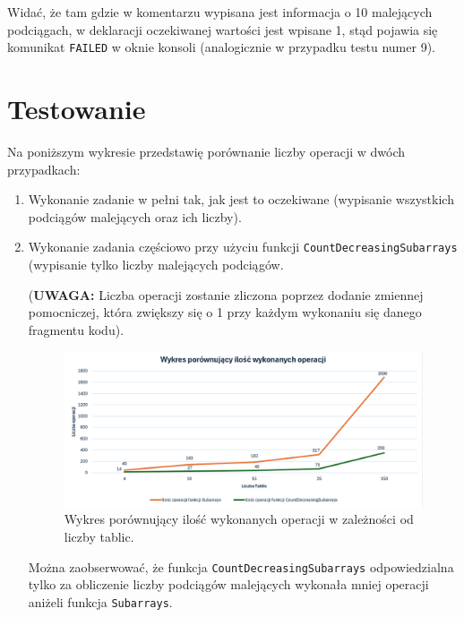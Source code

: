\documentclass[a4paper,12pt]{article}
\begin{document}
\rule{0cm}{0.1cm} %

Widać, że tam gdzie w komentarzu wypisana jest informacja o 10 malejących podciągach, w deklaracji oczekiwanej wartości jest wpisane 1, stąd pojawia się komunikat \texttt{FAILED} w oknie konsoli (analogicznie w przypadku testu numer 9).

\newpage

\section{Testowanie}

Na poniższym wykresie przedstawię porównanie liczby operacji w dwóch przypadkach:
\begin{enumerate}
\item{Wykonanie zadanie w pełni tak, jak jest to oczekiwane (wypisanie wszystkich podciągów malejących oraz ich liczby).}
\item{Wykonanie zadania częściowo przy użyciu funkcji \texttt{CountDecreasingSubarrays} (wypisanie tylko liczby malejących podciągów.}

(\textbf{UWAGA:} Liczba operacji zostanie zliczona poprzez dodanie zmiennej pomocniczej, która zwiększy się o 1 przy każdym wykonaniu się danego fragmentu kodu).

\begin{figure}[H]
    \centering
    \includegraphics[width=1\textwidth]{Wykres1.png}
    \caption{Wykres porównujący ilość wykonanych operacji w zależności od liczby tablic.}
    \label{fig:Wykres1}
\end{figure}

Można zaobserwować, że funkcja \texttt{CountDecreasingSubarrays} odpowiedzialna tylko za obliczenie liczby podciągów malejących wykonała mniej operacji aniżeli funkcja \texttt{Subarrays}.

\end{enumerate}

\rule{0cm}{0.5cm} %
\end{document}
